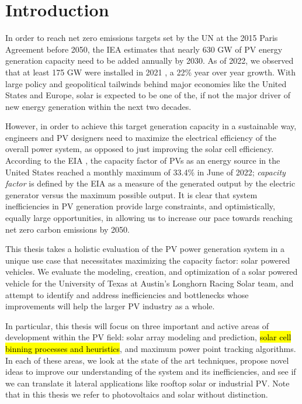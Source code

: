 \chapter{Introduction}

In order to reach net zero emissions targets set by the \ac{UN} at the
2015 Paris Agreement \cite{UN_Paris_agreement} before 2050, the \ac{IEA}
estimates that nearly 630 \ac{GW} \cite{IEA_roadmap} of \ac{PV} energy
generation capacity need to be added annually by 2030. As of 2022, we observed
that at least 175 GW were installed in 2021 \cite{IEA_trends}
\cite{IEA_snapshot}, a 22\% year over year growth. With large policy and
geopolitical tailwinds behind major economies like the United States and Europe,
solar is expected to be one of the, if not the major driver of new energy
generation within the next two decades.

However, in order to achieve this target generation capacity in a sustainable
way, engineers and \ac{PV} designers need to maximize the electrical
efficiency of the overall power system, as opposed to just improving the solar
cell efficiency. According to the \ac{EIA} \cite{EIA_capacity}, the capacity
factor of \ac{PV}s as an energy source in the United States reached a
monthly maximum of 33.4\% in June of 2022; \textit{capacity factor} is defined
by the \ac{EIA} as a measure of the generated output by the electric generator
versus the maximum possible output. It is clear that system inefficiencies in
\ac{PV} generation provide large constraints, and optimistically, equally
large opportunities, in allowing us to increase our pace towards reaching net
zero carbon emissions by 2050.

This thesis takes a holistic evaluation of the \ac{PV} power generation
system in a unique use case that necessitates maximizing the capacity factor:
solar powered vehicles. We evaluate the modeling, creation, and optimization of
a solar powered vehicle for the University of Texas at Austin's Longhorn Racing
Solar team, and attempt to identify and address inefficiencies and bottlenecks
whose improvements will help the larger \ac{PV} industry as a whole.

In particular, this thesis will focus on three important and active areas of
development within the PV field: solar array modeling and prediction,
\hl{solar cell binning processes and heuristics},
and maximum power point tracking algorithms.
In each of these areas, we look at the state of the art techniques, propose novel
ideas to improve our understanding of the system and its inefficiencies, and see
if we can translate it lateral applications like rooftop solar or industrial PV.
Note that in this thesis we refer to photovoltaics and solar without distinction.

